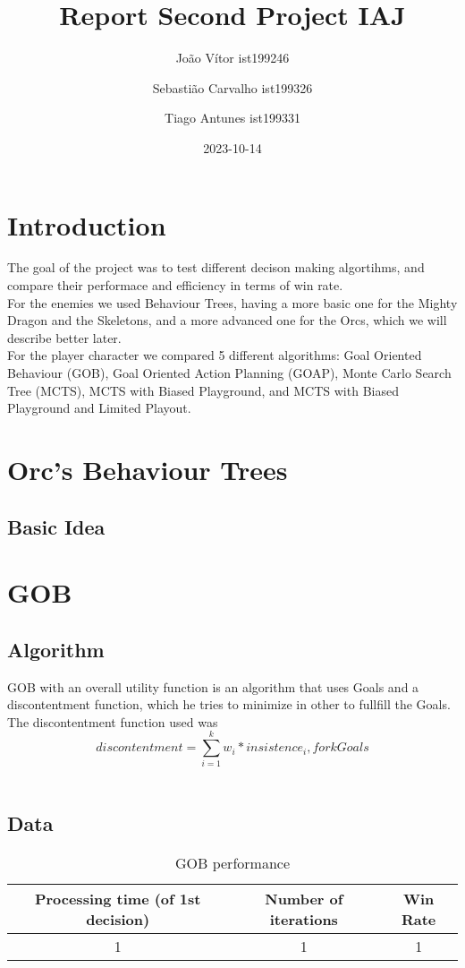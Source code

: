 \documentclass{article}
\title{Report Second Project IAJ}
\author{João Vítor ist199246
  \and Sebastião Carvalho ist199326
  \and Tiago Antunes ist199331}
\date{2023-10-14}
\begin{document}
  \maketitle
  \tableofcontents
  \newpage
  \section{Introduction}
  The goal of the project was to test different decison making algortihms, and compare their performace and efficiency in terms of win rate. \\
  For the enemies we used Behaviour Trees, having a more basic one for the Mighty Dragon and the Skeletons, and a more advanced one for the Orcs, 
  which we will describe better later.\\
  For the player character we compared 5 different algorithms: Goal Oriented Behaviour (GOB), Goal Oriented Action Planning (GOAP), Monte Carlo Search Tree (MCTS),
  MCTS with Biased Playground, and MCTS with Biased Playground and Limited Playout.
  \section{Orc's Behaviour Trees}
  \subsection{Basic Idea}

  \section{GOB}
  \subsection{Algorithm}
  GOB with an overall utility function is an algorithm that uses Goals and a discontentment function, which he tries to minimize in other to fullfill the Goals. \\
  The discontentment function used was \[discontentment = \sum_{i=1}^{k}w_i * insistence_i, for k Goals\]\\ 
  \subsection{Data}
  \begin{table}[h!]
    \centering
    \caption{GOB performance}
    \label{tab:tableGOB1}
    \begin{tabular}{c|c|c}
      \textbf{Processing time (of 1st decision)} & \textbf{Number of iterations} & \textbf{Win Rate}\\
      \hline
      1 & 1 & 1
    \end{tabular}
  \end{table}
\end{document}
